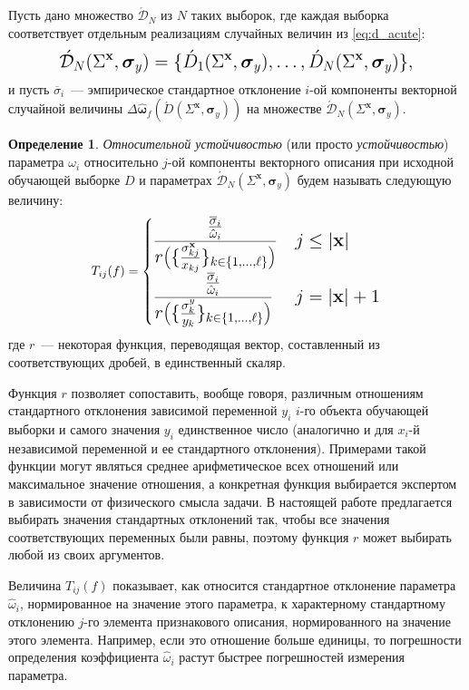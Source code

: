 \documentclass[11pt,a4paper]{article}
\theoremstyle{definition}
\newtheorem{defin}{Определение}
\begin{document}
Пусть дано множество $\acute{\mathcal{D}}_N$ из $N$ таких выборок, где каждая выборка
соответствует отдельным реализациям случайных величин из \eqref{eq:d_acute}:
\[
  \Large
  \acute{\mathcal{D}}_N (\Sigma^{\mathbf{x}}, \boldsymbol{\sigma}_y) = \{ \acute{D}_1 (\Sigma^{\mathbf{x}}, \boldsymbol{\sigma}_y), \dots, \acute{D}_N (\Sigma^{\mathbf{x}}, \boldsymbol{\sigma}_y) \},
\]
и пусть $\overline{\sigma}_i$~--- эмпирическое стандартное отклонение $i$-ой компоненты
векторной случайной величины
$\Delta\hat{\boldsymbol{\omega}}_f(\acute{D} (\Sigma^{\mathbf{x}}, \boldsymbol{\sigma}_y) )$
на множестве $\acute{\mathcal{D}}_N (\Sigma^{\mathbf{x}}, \boldsymbol{\sigma}_y)$.
\begin{defin}
\emph{Относительной устойчивостью} (или просто \emph{устойчивостью}) параметра
$\omega_i$ относительно $j$-ой компоненты векторного описания при исходной
обучающей выборке $D$ и параметрах $\acute{\mathcal{D}}_N (\Sigma^{\mathbf{x}}, \boldsymbol{\sigma}_y)$
будем называть следующую величину:
\begin{equation}
  \Large
  T_{ij}(f) =
	\begin{cases}
	  \displaystyle \frac{\frac{\overline{\sigma}_i}{\hat{\omega}_i}}{r\big(\{ \frac{\sigma_{kj}^{\mathbf{x}}}{x_{kj}} \}_{k \in \{ 1, \dots, \ell \}}\big)} & j \leq |\mathbf{x}| \\
	  \displaystyle \frac{\frac{\overline{\sigma}_i}{\hat{\omega}_i}}{r\big(\{ \frac{\sigma_{k}^{y}}{y_k} \}_{k \in \{ 1, \dots, \ell \}}\big)} & j = |\mathbf{x}| + 1
	\end{cases}
  \label{eq:t_rel}
\end{equation}
где $r$~--- некоторая функция, переводящая вектор, составленный из соответствующих
дробей, в единственный скаляр.
\end{defin}

Функция $r$ позволяет сопоставить, вообще говоря, различным отношениям стандартного
отклонения зависимой переменной $y_i$ $i$-го объекта обучающей выборки и самого значения $y_i$
единственное число (аналогично и для $x_i$-й независимой переменной и ее стандартного отклонения).
Примерами такой функции могут являться среднее арифметическое
всех отношений или максимальное значение отношения, а конкретная функция выбирается
экспертом в зависимости от физического смысла задачи.
В настоящей работе предлагается выбирать значения стандартных отклонений так, чтобы
все значения соответствующих переменных были равны, поэтому функция $r$ может выбирать
любой из своих аргументов.

Величина $T_{ij}(f)$ показывает, как относится стандартное отклонение
параметра $\hat{\omega}_i$, нормированное на значение этого параметра, к характерному стандартному
отклонению $j$-го элемента признакового описания, нормированного на значение этого
элемента. Например, если это отношение больше единицы, то погрешности определения коэффициента
$\hat{\omega}_i$ растут быстрее погрешностей измерения параметра.
\end{document}
